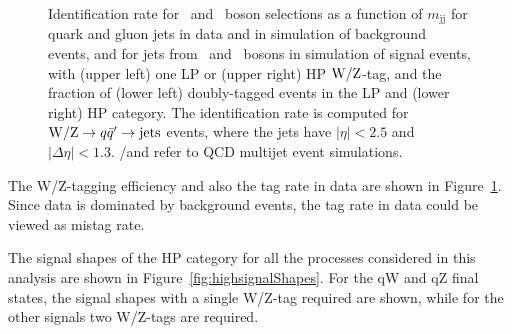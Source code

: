 \begin{figure}[th!b]
\caption{Identification rate for \PW\ and \cPZ\ boson selections
  as a function of $m_\mathrm{jj}$ for quark and gluon
  jets in data and in simulation of background events,
  and for jets from \PW\ and \cPZ\ bosons in simulation of signal events,
  with (upper left) one LP or (upper
  right) HP ${\rm W}/{\rm Z}$-tag, and the fraction of (lower left)
  doubly-tagged events in the LP and (lower right) HP category. The
  identification rate is computed for ${\rm W}/{\rm Z}\to q\bar q' \to \text{jets}$
  events, where the jets have $|\eta| < 2.5$ and
  $| \Delta\eta |<1.3$.  \MADGRAPH/\PYTHIA and \HERWIG{++} refer to
  QCD multijet event simulations.
  \label{fig:WZefficiencies}}
\end{figure}



The W/Z-tagging efficiency and also the tag rate in data are shown in 
Figure~\ref{fig:WZefficiencies}. Since data is dominated by background events, the tag rate
in data could be viewed as mistag rate. 


The signal shapes of the HP category for all the processes considered in this analysis are shown in 
Figure~\ref{fig:highsignalShapes}.  
For the qW and qZ final states, the signal shapes with a single W/Z-tag required are shown, while for the other signals two W/Z-tags are required.



